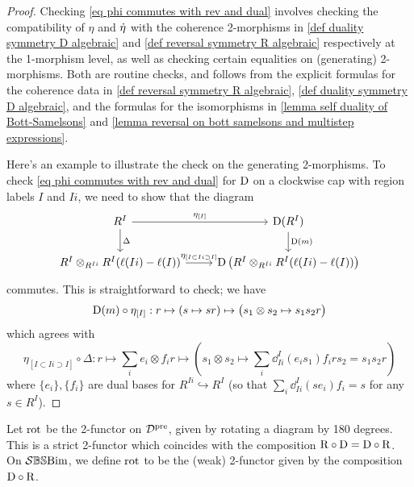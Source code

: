 \begin{proof}
    Checking \cref{eq phi commutes with rev and dual} involves checking the compatibility of $\eta$ and $\dot{\eta}$ with the coherence 2-morphisms in \cref{def duality symmetry D algebraic} and \cref{def reversal symmetry R algebraic} respectively at the 1-morphism level, as well as checking certain equalities on (generating) 2-morphisms.
    Both are routine checks, and follows from the explicit formulas for the coherence data in \cref{def reversal symmetry R algebraic}, \cref{def duality symmetry D algebraic}, and the formulas for the isomorphisms in \cref{lemma self duality of Bott-Samelsons} and \cref{lemma reversal on bott samelsons and multistep expressions}.
    
    Here's an example to illustrate the check on the generating 2-morphisms. To check \cref{eq phi commutes with rev and dual} for $\mathrm{D}$ on a clockwise cap with region labels $I$ and $Ii$, we need to show that the diagram
    \begin{equation*}
    \begin{tikzcd}
        R^I \arrow[r, "\eta_{[I]}"] \arrow[d, "\Delta"] & \Dual(R^I) \arrow[d, "\Dual(m)"] \\
        R^I \otimes_{R^{Ii}} R^I(\ell(Ii)-\ell(I)) \arrow[r, "\eta_{[I\subset Ii \supset I]}"] &\Dual\left(R^I\otimes_{R^{Ii}}R^I(\ell(Ii)-\ell(I))\right)
    \end{tikzcd}            
    \end{equation*}
    commutes. 
    This is straightforward to check; we have
    \begin{equation*}
        \mathrm{D}(m)\circ \eta_{[I]}: r \mapsto (s\mapsto sr) \mapsto \bigl( s_1 \otimes s_2 \mapsto s_1 s_2 r \bigr)
    \end{equation*}
    which agrees with
    \begin{equation}
      \eta_{[I \subset Ii \supset I]}\circ \Delta: r\mapsto \sum_i e_i \otimes f_i r\mapsto \left(s_1 \otimes s_2 \mapsto \sum_i\dd^I_{Ii}(e_is_1)f_i rs_2 = s_1 s_2 r\right)  
    \end{equation}
    where $\{e_i\}, \{f_i\}$ are dual bases for $R^{Ii}\hookrightarrow R^I$ (so that $\sum_i\dd^{I}_{Ii}(se_i)f_i=s$ for any $s \in R^I$).
\end{proof}

\begin{defn}\label{def rotation by 180 degrees}
    Let $\operatorname{rot}$ be the 2-functor on $\mathcal{D}^{\operatorname{pre}}$, given by rotating a diagram by 180 degrees. This is a strict 2-functor which coincides with the composition $\mathrm{R} \circ \mathrm{D}=\mathrm{D} \circ \mathrm{R}$.
    On $\mathcal{S}\mathbb{BS}\text{Bim}$, we define $\operatorname{rot}$ to be the (weak) 2-functor given by the composition $\mathrm{D} \circ \mathrm{R}$.
\end{defn}


